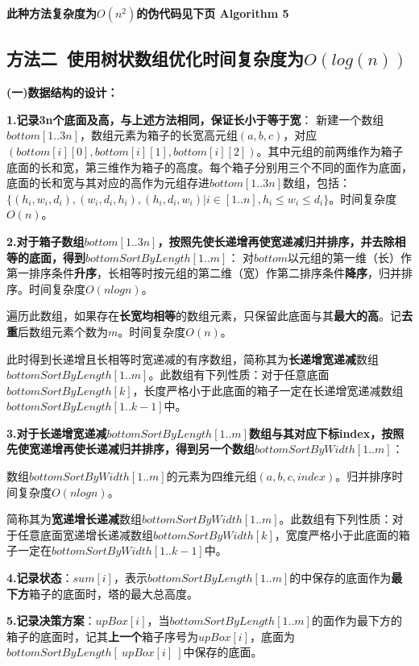 \documentclass{article}
\begin{document}
\textbf{此种方法复杂度为}$O(n^2)$\textbf{的伪代码见下页 Algorithm 5}

\subsection{方法二\ 使用树状数组优化时间复杂度为$O(log(n))$}
\textbf{(一)数据结构的设计：}

\textbf{1.记录3n个底面及高，与上述方法相同，保证长小于等于宽}：
新建一个数组$bottom[1..3n]$，数组元素为箱子的长宽高元组$(a,b,c)$，对应$(bottom[i][0],bottom[i][1],bottom[i][2])$。其中元组的前两维作为箱子底面的长和宽，第三维作为箱子的高度。每个箱子分别用三个不同的面作为底面，底面的长和宽与其对应的高作为元组存进$bottom[1..3n]$数组，包括：$\{(h_i,w_i,d_i),(w_i,d_i,h_i),(h_i,d_i,w_i)|i\in [1..n],h_i\leq w_i\leq d_i\}$。时间复杂度$O(n)$。

\textbf{2.对于箱子数组$bottom[1..3n]$，按照先使长递增再使宽递减归并排序，并去除相等的底面，得到$bottomSortByLength[1..m]$}：
对$bottom$以元组的第一维（长）作第一排序条件\textbf{升序}，长相等时按元组的第二维（宽）作第二排序条件\textbf{降序}，归并排序。时间复杂度$O(nlogn)$。

遍历此数组，如果存在\textbf{长宽均相等}的数组元素，只保留此底面与其\textbf{最大的高}。记\textbf{去重}后数组元素个数为$m$。时间复杂度$O(n)$。

此时得到长递增且长相等时宽递减的有序数组，简称其为\textbf{长递增宽递减}数组$bottomSortByLength[1..m]$。此数组有下列性质：对于任意底面$bottomSortByLength[k]$，长度严格小于此底面的箱子一定在长递增宽递减数组$bottomSortByLength[1..k-1]$中。

\textbf{3.对于长递增宽递减$bottomSortByLength[1..m]$数组与其对应下标index，按照先使宽递增再使长递减归并排序，得到另一个数组$bottomSortByWidth[1..m]$}：

数组$bottomSortByWidth[1..m]$的元素为四维元组$(a,b,c,index)$。归并排序时间复杂度$O(nlogn)$。

简称其为\textbf{宽递增长递减}数组$bottomSortByWidth[1..m]$。此数组有下列性质：对于任意底面宽递增长递减数组$bottomSortByWidth[k]$，宽度严格小于此底面的箱子一定在$bottomSortByWidth[1..k-1]$中。

\textbf{4.记录状态}：$sum[i]$，表示$bottomSortByLength[1..m]$的中保存的底面作为\textbf{最下方}箱子的底面时，塔的最大总高度。

\textbf{5.记录决策方案}：$upBox[i]$，当$bottomSortByLength[1..m]$的面作为最下方的箱子的底面时，记其\textbf{上一个}箱子序号为$upBox[i]$，底面为$bottomSortByLength[\ upBox[i]\ ]$中保存的底面。
\end{document}

